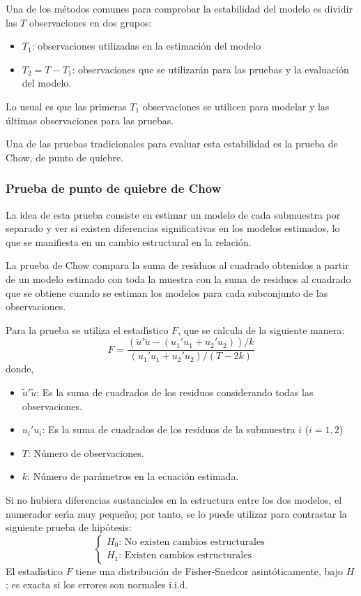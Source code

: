 Una de los m\'{e}todos comunes para comprobar la estabilidad del modelo es 
dividir las $T$ observaciones en dos grupos:

\begin{itemize}
\item $T_{1}$: observaciones utilizadas en la estimaci\'{o}n del modelo
\item $T_{2}=T-T_{1}$: observaciones que se utilizar\'{a}n para las pruebas y la evaluaci\'{o}n del modelo.
\end{itemize}
Lo usual es que las primeras $T_{1}$ observaciones se utilicen para modelar 
y las \'{u}ltimas observaciones para las pruebas.

Una de las pruebas tradicionales para evaluar esta estabilidad es la prueba 
de Chow, de punto de quiebre.


\subsubsection*{Prueba de punto de quiebre de Chow}

La idea de esta prueba consiste en estimar un modelo de cada submuestra por 
separado y ver si existen diferencias significativas en los modelos 
estimados, lo que se manifiesta en un cambio estructural en la relaci\'{o}n.

La prueba de Chow compara la suma de residuos al cuadrado obtenidos a partir 
de un modelo estimado con toda la muestra con la suma de residuos al 
cuadrado que se obtiene cuando se estiman los modelos para cada subconjunto 
de las observaciones.

Para la prueba se utiliza el estad\'{\i}stico $F$, que se calcula de la 
siguiente manera:
\[
F=\frac{\left( \tilde{u}'\tilde{u}-(u_{1}'u_{1}+u_{2}'u_{2}) 
\right)/k}{(u_{1}'u_{1}+u_{2}'u_{2})/(T-2k)}
\]
donde,
\begin{itemize}
 \item $\tilde{u}'\tilde{u}$: Es la suma de cuadrados de los residuos considerando todas las observaciones.
 \item $u_{i}'u_{i}$: Es la suma de cuadrados de los residuos de la submuestra $i$  ($i=1,  2$)
 \item $T$: N\'{u}mero de observaciones.
 \item $k$: N\'{u}mero de par\'{a}metros en la ecuaci\'{o}n estimada.
\end{itemize}

Si no hubiera diferencias sustanciales en la estructura entre los dos 
modelos, el numerador ser\'{\i}a muy peque\~{n}o; por tanto, se lo puede 
utilizar para contrastar la siguiente prueba de hip\'{o}tesis:
\[
\left\{ {\begin{array}{l}
 H_{0}\text{: No  existen  cambios  estructurales} \\ 
 H_{1}\text{: Existen  cambios  estructurales}  
 \end{array}} \right.
\]
El estad\'{\i}stico $F$ tiene una distribuci\'{o}n de Fisher-Snedcor 
asint\'{o}ticamente, bajo $H$; es exacta si los errores son normales i.i.d.

